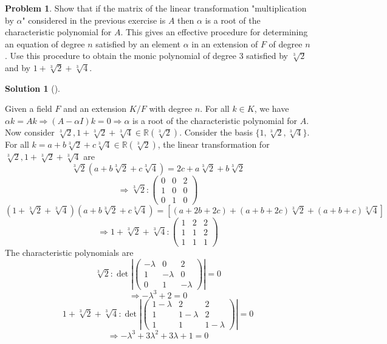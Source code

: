 \documentclass{article}
\theoremstyle{definition}
\newtheorem{prob}{Problem}
\newtheorem*{sol}{Solution}
\newenvironment{sols}[1][]{%
  \begin{sol}[#1]$ $\par\nobreak\ignorespaces
}{%
  \end{sol}
}
\begin{document}
\setcounter{prob}{19}
\begin{prob}
	Show that if the matrix of the linear transformation "multiplication by $\alpha$" considered in the previous exercise is $A$ then $\alpha$ is a root of the characteristic polynomial for $A$.
	This gives an effective procedure for determining an equation of degree $n$ satisfied by an element $\alpha$ in an extension of $F$ of degree $n$.
	Use this procedure to obtain the monic polynomial of degree 3 satisfied by $\sqrt[3]{2}$ and by $1 + \sqrt[3]{2} + \sqrt[3]{4}$.
\end{prob}

\begin{sols}
	Given a field $F$ and an extension $K/F$ with degree $n$.
	For all $k \in K$, we have $\alpha k = A k \Rightarrow (A - \alpha I) k = 0  \Rightarrow \alpha$ is a root of the characteristic polynomial for $A$.
	Now consider $\sqrt[3]{2}, 1 + \sqrt[3]{2} + \sqrt[3]{4} \in \mathbb{R}(\sqrt[3]{2})$.
	Consider the basis $\{1, \sqrt[3]{2}, \sqrt[3]{4}\}$.
	For all $k = a + b \sqrt[3]{2} + c \sqrt[3]{4} \in \mathbb{R}(\sqrt[3]{2})$, the linear transformation for $\sqrt[3]{2}, 1 + \sqrt[3]{2} + \sqrt[3]{4}$ are
	\[
		\sqrt[3]{2} (a + b \sqrt[3]{2} + c \sqrt[3]{4}) = 2c + a \sqrt[3]{2} + b \sqrt[3]{2}
	\]
	\[
		\Rightarrow 
		\sqrt[3]{2}:
		\begin{pmatrix}
			0 & 0 & 2\\
			1 & 0 & 0\\
			0 & 1 & 0
		\end{pmatrix}
	\]
	\[
		(1 + \sqrt[3]{2} + \sqrt[3]{4})(a + b \sqrt[3]{2} + c \sqrt[3]{4}) = [(a + 2b + 2c) + (a + b + 2c) \sqrt[3]{2} + (a + b + c) \sqrt[3]{4}]
	\]
	\[
		\Rightarrow 1 + \sqrt[3]{2} + \sqrt[3]{4}:
		\begin{pmatrix}
			1 & 2 & 2\\
			1 & 1 & 2\\
			1 & 1 & 1
		\end{pmatrix}
	\]
	The characteristic polynomials are
	\[
		\sqrt[3]{2}:
		\det \left|
		\begin{pmatrix}
			- \lambda & 0 & 2\\
			1 & - \lambda & 0\\
			0 & 1 & -\lambda
		\end{pmatrix}
		\right| = 0
	\]
	\[
		\Rightarrow - \lambda^3 + 2 = 0 
	\]
	\[
		1 + \sqrt[3]{2} + \sqrt[3]{4}:
		\det \left|
		\begin{pmatrix}
			1 - \lambda & 2 & 2\\
			1 & 1 - \lambda & 2\\
			1 & 1 & 1 - \lambda
		\end{pmatrix}
		\right| = 0
	\]
	\[
		\Rightarrow - \lambda^3 + 3 \lambda^2 + 3 \lambda + 1 = 0 
	\]

\end{sols}
\end{document}
